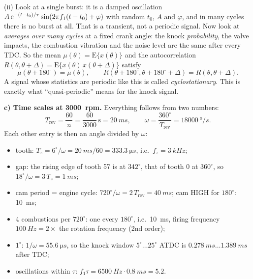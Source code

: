 \begin{solution}
(ii) Look at a single burst: it is a damped oscillation
$A\,\mathrm{e}^{-(t-t_0)/\tau}\sin(2\pi f_1(t-t_0)+\varphi)$ with random $t_0$, $A$ and
$\varphi$, and in many cycles there is no burst at all. That is a transient,
not a periodic signal. Now look at \emph{averages over many cycles} at a fixed
crank angle: the knock \emph{probability}, the valve impacts, the combustion
vibration and the noise level are the same after every TDC. So the mean
$\mu(\theta)=\mathrm{E}\{x(\theta)\}$ and the autocorrelation
$R(\theta,\theta+\Delta)=\mathrm{E}\{x(\theta)\,x(\theta+\Delta)\}$ satisfy
\[ \mu(\theta+180^\circ)=\mu(\theta),\qquad
   R(\theta+180^\circ,\theta+180^\circ+\Delta)=R(\theta,\theta+\Delta). \]
A signal whose statistics are periodic like this is called
\emph{cyclostationary}. This is exactly what ``quasi-periodic'' means for the
knock signal.

\textbf{c) Time scales at \SI{3000}{rpm}.} Everything follows from two
numbers:
\[ T_{\text{rev}}=\frac{60}{n}=\frac{60}{3000}\,\text{s}=\SI{20}{ms},\qquad
   \omega=\frac{360^\circ}{T_{\text{rev}}}=\SI{18000}{\degree/s}. \]
Each other entry is then an angle divided by $\omega$:
\begin{itemize}[itemsep=1pt]
  \item tooth: $T_z=6^\circ/\omega=\SI{20}{ms}/60=\SI{333.3}{\micro s}$, i.e.\ $f_z=\SI{3}{kHz}$;
  \item gap: the rising edge of tooth 57 is at $342^\circ$, that of tooth 0 at
    $360^\circ$, so $18^\circ/\omega=3\,T_z=\SI{1}{ms}$;
  \item cam period = engine cycle: $720^\circ/\omega=2\,T_{\text{rev}}=\SI{40}{ms}$;
    cam HIGH for $180^\circ$: \SI{10}{ms};
  \item 4 combustions per $720^\circ$: one every $180^\circ$, i.e.\ \SI{10}{ms},
    firing frequency $\SI{100}{Hz}=2\times$ the rotation frequency (2nd order);
  \item $1^\circ$: $1/\omega=\SI{55.6}{\micro s}$, so the knock window
    $5^\circ\dots25^\circ$ ATDC is $\SI{0.278}{ms}\dots\SI{1.389}{ms}$ after TDC;
  \item oscillations within $\tau$: $f_1\tau=\SI{6500}{Hz}\cdot\SI{0.8}{ms}=5.2$.
\end{itemize}


\end{solution}
